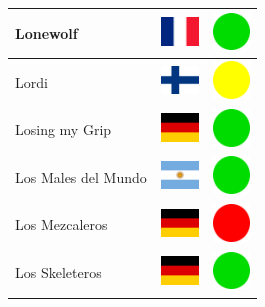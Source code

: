 \documentclass[12pt, a4paper, twoside]{report}
\begin{document}
\begin{center}
\begin{longtable}{|p{5cm}|p{2cm}|p{2cm}|}
 Lonewolf                                                   & \includegraphics[width=1cm]{../img/flags/fr} &   \includegraphics[width=1cm]{../likes/y} \\ \hline
 Lordi                                                      & \includegraphics[width=1cm]{../img/flags/fi} &   \includegraphics[width=1cm]{../likes/m} \\ \hline
 Losing my Grip                                             & \includegraphics[width=1cm]{../img/flags/de} &   \includegraphics[width=1cm]{../likes/y} \\ \hline
 Los Males del Mundo                                        & \includegraphics[width=1cm]{../img/flags/ar} &   \includegraphics[width=1cm]{../likes/y} \\ \hline
 Los Mezcaleros                                             & \includegraphics[width=1cm]{../img/flags/de} &   \includegraphics[width=1cm]{../likes/n} \\ \hline
 Los Skeleteros                                             & \includegraphics[width=1cm]{../img/flags/de} &   \includegraphics[width=1cm]{../likes/y} \\ \hline

\end{longtable}
\end{center}
\end{document}
